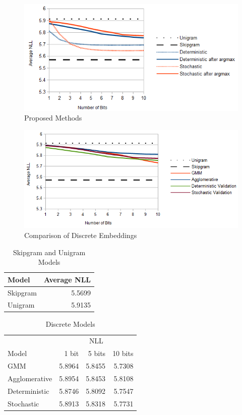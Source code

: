 \documentclass[sigconf]{acmart}
\begin{document}
\begin{figure}
\caption{Proposed Methods}
\label{f:proposed}
\includegraphics[scale=0.5]{images/proposed.png}
\end{figure}

\begin{figure}
\caption{Comparison of Discrete Embeddings}
\label{f:discrete}
\includegraphics[scale=0.5]{images/discrete.png}
\end{figure}

\begin{table}
\caption{Skipgram and Unigram Models}
\label{t:baseline}
  \begin{tabular}{l r}
	\hline \hline
	 Model & Average NLL \\
	\hline
	Skipgram & 5.5699 \\
	Unigram & 5.9135 \\
	\hline \hline
  \end{tabular}
\end{table}

\begin{table}
\caption{Discrete Models}
\label{t:discrete}
  \begin{tabular}{l r r r}
	\hline \hline
 & \multicolumn{3}{|c|}{NLL} \\
	 Model & 1 bit & 5 bits & 10 bits\\
	\hline
GMM & 5.8964 & 5.8455 & 5.7308 \\
Agglomerative & 5.8954 & 5.8453 & 5.8108 \\
Deterministic & 5.8746 & 5.8092 & 5.7547 \\
Stochastic & 5.8913 & 5.8318 & 5.7731 \\
	\hline \hline
  \end{tabular}
\end{table}
\end{document}
